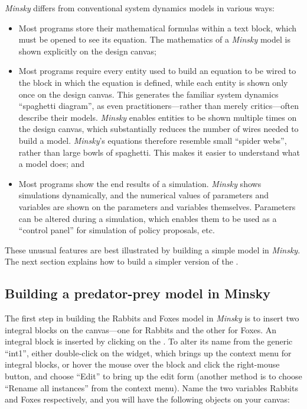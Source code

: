 \emph{Minsky} differs from conventional system dynamics models in
various ways:
\begin{itemize}
\item Most programs store their mathematical formulas within a text block,
which must be opened to see its equation. The mathematics of a \emph{Minsky}
model is shown explicitly on the design canvas;
\item Most programs require every entity used to build an equation to be
wired to the block in which the equation is defined, while each entity
is shown only once on the design canvas. This generates the familiar
system dynamics ``spaghetti diagram'', as even practitioners---rather
than merely critics---often describe their models. \emph{Minsky}
enables entities to be shown multiple times on the design canvas,
which substantially reduces the number of wires needed to build a
model. \emph{Minsky}'s equations therefore resemble small ``spider
webs'', rather than large bowls of spaghetti. This makes it easier
to understand what a model does; and
\item Most programs show the end results of a simulation. \emph{Minsky}
shows simulations dynamically, and the numerical values of parameters
and variables are shown on the parameters and variables themselves.
Parameters can be altered during a simulation, which enables them
to be used as a ``control panel'' for simulation of policy proposals,
etc.
\end{itemize}
These unusual features are best illustrated by building a simple model
in \emph{Minsky}. The next section explains how to build a simpler
version of the .

\subsection{Building a predator-prey model in Minsky}

\label{Minsky model building}

The first step in building the Rabbits and Foxes model in \emph{Minsky}
is to insert two integral blocks on the canvas---one for Rabbits
and the other for Foxes. An integral block is inserted by clicking
on the .
To alter its name from the generic ``int1'', either double-click
on the widget, which brings up the context menu for integral blocks,
or hover the mouse over the block and click the right-mouse button,
and choose ``Edit'' to bring up the edit form (another method is
to choose ``Rename all instances'' from the context menu). Name
the two variables Rabbits and Foxes respectively, and you will have
the following objects on your canvas:

